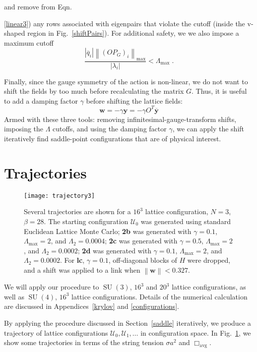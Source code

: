 \documentclass[preprint,aps,prd]{revtex4-2}
\newcommand{\be}{\begin{equation}}
\newcommand{\eq}{\end{equation}}
\newcommand{\plaquette}{\Box}
\newcommand{\config}{\mathcal{U}}
\DeclareMathOperator{\SU}{SU}
\begin{document}
and remove from Eqn.~{\ref{linear3}) any rows associated with eigenpairs
that violate the cutoff (inside the v-shaped
region in Fig.~\ref{shiftPairs}).  For additional safety, we
we also impose a maximum cutoff
\be
    \frac{\left|\overline{q}_i\right|
      \left\lVert \left(O P_G\right)_i\right\rVert_\mathrm{max}}
    {\left|\lambda_i\right|}
    < \Lambda_\mathrm{max} \; .
\eq

Finally, since the gauge symmetry of the action is non-linear,
we do not want to shift the fields by too much before recalculating
the matrix $G$.
Thus, it is useful to add a damping factor $\gamma$ before
shifting the lattice fields:
\be
         \mathbf{w} = - \gamma \mathbf{y} = - \gamma O^T \overline{\mathbf{y}}
\eq
Armed with these three tools:  removing infinitesimal-gauge-transform shifts,
imposing the $\Lambda$ cutoffs, and using the damping factor $\gamma$,
we can apply the shift iteratively find saddle-point configurations
that are of physical interest.

\section{Trajectories}

\begin{figure}
\texttt{[image: trajectory3]}
\caption{Several trajectories are shown for a $16^3$ lattice configuration,
  $N=3$, $\beta=28$.
  The starting configuration $\config_0$ was generated using standard Euclidean
  Lattice Monte Carlo;
  {\bf 2b} was generated with $\gamma=0.1$, $\Lambda_\mathrm{max} = 2$,
  and $\Lambda_2=0.0004$;
  {\bf 2c} was generated with $\gamma=0.5$, $\Lambda_\mathrm{max} = 2$,
  and $\Lambda_2=0.0002$;
  {\bf 2d} was generated with $\gamma=0.1$, $\Lambda_\mathrm{max} = 2$,
  and $\Lambda_2=0.0002$.
  For {\bf lc}, $\gamma=0.1$, off-diagonal blocks of $H$ were dropped,
  and a shift
  was applied to a link when $\left\lVert\mathbf{w}\right\rVert<0.327$.
  \label{trajectory3}}
\end{figure}
  
We will apply our procedure to $\SU(3)$, $16^3$ and $20^3$ lattice
configurations, as well as $\SU(4)$, $16^3$ lattice
configurations.  Details of the numerical calculation
are discussed in Appendices~\ref{krylov} and \ref{configurations}.

By applying the procedure discussed in Section~\ref{saddle} iteratively,
we produce a trajectory of lattice configurations $\config_0, \config_1, \ldots$
in configuration space.  In Fig.~\ref{trajectory3}, we show some trajectories
in terms of the string tension $\sigma a^2$ and $\plaquette_\mathrm{avg}$.

}
\end{document}
